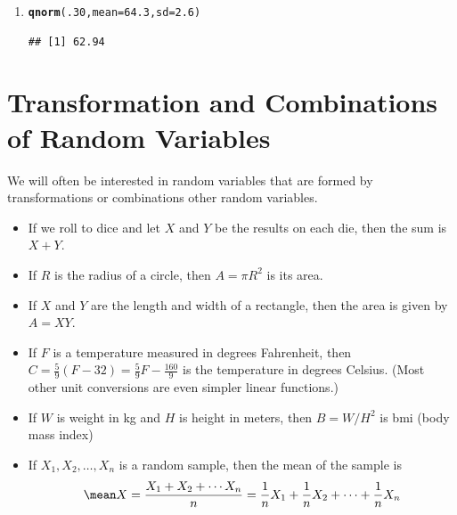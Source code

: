 \documentclass[twoside]{book}\usepackage[]{graphicx}\usepackage[]{xcolor}
\makeatletter
\newcommand{\hlnum}[1]{\textcolor[rgb]{0.686,0.059,0.569}{#1}}%
\newcommand{\hlstd}[1]{\textcolor[rgb]{0.345,0.345,0.345}{#1}}%
\newcommand{\hlkwc}[1]{\textcolor[rgb]{0.333,0.667,0.333}{#1}}%
\newcommand{\hlkwd}[1]{\textcolor[rgb]{0.737,0.353,0.396}{\textbf{#1}}}%
\newenvironment{kframe}{%
 \def\at@end@of@kframe{}%
 \ifinner\ifhmode%
  \def\at@end@of@kframe{\end{minipage}}%
  \begin{minipage}{\columnwidth}%
 \fi\fi%
 \def\FrameCommand##1{\hskip\@totalleftmargin \hskip-\fboxsep
 \colorbox{shadecolor}{##1}\hskip-\fboxsep
     \hskip-\linewidth \hskip-\@totalleftmargin \hskip\columnwidth}%
 \MakeFramed {\advance\hsize-\width
   \@totalleftmargin\z@ \linewidth\hsize
   \@setminipage}}%
 {\par\unskip\endMakeFramed%
 \at@end@of@kframe}
\newenvironment{knitrout}{}{} %
\def\Chapter#1{%
\chapter{#1}
}
\newif\ifsolutions
\newif\ifsolutionslocal
\makeatother
\begin{document}
\begin{solution}
\begin{enumerate}
\item
\begin{knitrout}
\color{fgcolor}\begin{kframe}
\begin{alltt}
\hlkwd{qnorm}\hlstd{(}\hlnum{.30}\hlstd{,} \hlkwc{mean} \hlstd{=} \hlnum{64.3}\hlstd{,} \hlkwc{sd} \hlstd{=} \hlnum{2.6}\hlstd{)}
\end{alltt}
\begin{verbatim}
## [1] 62.94
\end{verbatim}
\end{kframe}
\end{knitrout}

\end{enumerate}
\end{solution}

\shipoutProblems

\ifsolutions
\ifsolutionslocal
\newpage
\section*{Solutions}
\shipoutSolutions
\fi
\fi





\Chapter{Transformation and Combinations of Random Variables}

We will often be interested in random variables that are formed by transformations
or combinations other random variables.
\begin{itemize}
	\item
		If we roll to dice and let $X$ and $Y$ be the results on each die,
		then the sum is $X+Y$.
	\item
		If $R$ is the radius of a circle, then $A = \pi R^2$ is its area.
	\item
		If $X$ and $Y$ are the length and width of a rectangle, then
		the area is given by $A = X Y$.
	\item
		If $F$ is a temperature measured in degrees Fahrenheit, then 
		$C = \frac{5}{9}(F-32) = \frac59 F - \frac{160}{9}$ is the 
		temperature in degrees Celsius. (Most other unit conversions
		are even simpler linear functions.)
	\item
		If $W$ is weight in kg and $H$ is height in meters, then
		$B = W/H^2$ is bmi (body mass index)

	\item
		If $X_1, X_2, \dots, X_n$ is a random sample, then the mean of the sample
		is 
		\[
		\mean X = \frac{X_1 + X_2 + \cdots X_n}{n}
		=
		\frac1n X_1 +
		\frac1n X_2 + \cdots +
		\frac1n X_n 
		\]
	\end{itemize}
\end{document}
